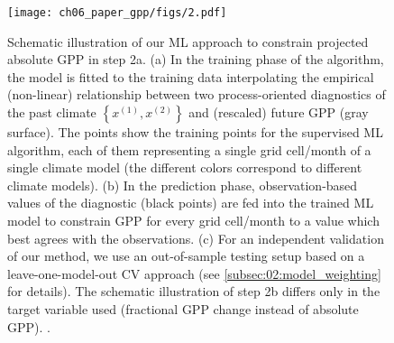 \begin{figure}[p]
  \centering
  \texttt{[image: ch06\_paper\_gpp/figs/2.pdf]}
  \caption[
    Schematic illustration of our \acl{ML} approach to constrain projected
    absolute \acf{GPP} at the end of the  century in step 2a.
  ]{
    Schematic illustration of our \acf{ML} approach to constrain projected
    absolute \acf{GPP} in step 2a. (a) In the training phase of the algorithm,
    the model is fitted to the training data interpolating the empirical
    (non-linear) relationship between two process-oriented diagnostics of the
    past climate $\left\{ x^{(1)}, x^{(2)} \right\}$ and (rescaled) future
    \acs{GPP} (gray surface). The points show the training points for the
    supervised \acs{ML} algorithm, each of them representing a single grid
    cell/month of a single climate model (the different colors correspond to
    different climate models). (b) In the prediction phase, observation-based
    values of the diagnostic (black points) are fed into the trained \acs{ML}
    model to constrain \acs{GPP} for every grid cell/month to a value which
    best agrees with the observations. (c) For an independent validation of our
    method, we use an out-of-sample testing setup based on a
    leave-one-model-out \acl{CV} approach (see \cref{subsec:02:model_weighting}
    for details). The schematic illustration of step 2b differs only in the
    target variable used (fractional \acs{GPP} change instead of absolute
    \acs{GPP}). .
  }
  \label{fig:06:mlr_concept}
\end{figure}

